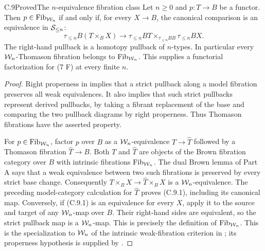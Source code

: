 \begin{claim}{C.9}{Proved}{The $n$-equivalence fibration class}
Let $n\geq0$ and $p:T\to B$ be a functor. Then
$p\in\operatorname{Fib}_{\mathcal{W}_n}$ if and only if, for every $X\to B$, the canonical
comparison is an equivalence in $\mathcal{S}_{\leq n}$:
\[
 \tau_{\leq n}B(T\times_BX)\longrightarrow
 \tau_{\leq n}BT
 \mathbin{\times_{\tau_{\leq n}BB}}
 \tau_{\leq n}BX.                                      \tag{C.9.1}
\]
The right-hand pullback is a homotopy pullback of $n$-types.
In particular every $\mathcal{W}_n$-Thomason fibration belongs to
$\operatorname{Fib}_{\mathcal{W}_n}$. This supplies a functorial factorization for (7 F)
at every finite $n$.
\end{claim}
\begin{proof}
Right properness in  implies that a strict pullback
along a model fibration preserves all weak equivalences. It also
implies that such strict pullbacks represent derived pullbacks,
by taking a fibrant replacement of the base and comparing the two
pullback diagrams by right properness. Thus Thomason fibrations
have the asserted property.

For $p\in\operatorname{Fib}_{\mathcal{W}_n}$, factor $p$ over $B$ as a $\mathcal{W}_n$-equivalence
$T\to\widehat T$ followed by a Thomason fibration
$\widehat T\to B$. Both $T$ and $\widehat T$ are objects of the
Brown fibration category over $B$ with intrinsic fibrations
$\operatorname{Fib}_{\mathcal{W}_n}$. The dual Brown lemma of Part A says that a weak
equivalence between two such fibrations is preserved by every
strict base change. Consequently
$T\times_BX\to\widehat T\times_BX$ is a $\mathcal{W}_n$-equivalence.
The preceding model-category calculation for $\widehat T$ proves
(C.9.1), including its canonical map. Conversely, if (C.9.1) is
an equivalence for every $X$, apply it to the source and target of
any $\mathcal{W}_n$-map over $B$. Their right-hand sides are equivalent,
so the strict pullback map is a $\mathcal{W}_n$-map. This is precisely the
definition of $\operatorname{Fib}_{\mathcal{W}_n}$.
This is the specialization to $\mathcal{W}_n$ of the intrinsic
weak-fibration criterion in
\citet[Proposition 6.2.3]{RootCisinski2006}; its properness
hypothesis is supplied by .
\end{proof}

